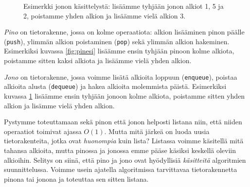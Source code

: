 \begin{figure}
\center
{}
\caption{Esimerkki jonon käsittelystä:
lisäämme tyhjään jonon alkiot 1, 5 ja 2,
poistamme yhden alkion ja lisäämme vielä alkion 3.}
\label{fig:jonesi}
\end{figure}


\emph{Pino} on tietorakenne, jossa on kolme operaatiota:
alkion lisääminen pinon päälle (\texttt{push}),
ylimmän alkion poistaminen (\texttt{pop})
sekä ylimmän alkion hakeminen.
Esimerkiksi kuvassa \ref{fig:pinesi} lisäämme ensin tyhjään pinoon kolme alkiota,
poistamme sitten kaksi alkiota ja lisäämme vielä yhden alkion.


\emph{Jono} on tietorakenne, jossa voimme lisätä alkioita
loppuun (\texttt{enqueue}),
poistaa alkioita alusta (\texttt{dequeue})
ja hakea alkioita molemmista päistä.
Esimerkiksi kuvassa \ref{fig:jonesi} lisäämme ensin tyhjään jonoon
kolme alkiota, poistamme sitten yhden alkion ja lisämme vielä yhden alkion.

Pystymme toteuttamaan sekä pinon että jonon helposti
listana niin, että niiden operaatiot toimivat ajassa $O(1)$.
Mutta mitä järkeä on luoda uusia tietorakenteita,
jotka ovat \emph{huonompia} kuin lista?
Listassa voimme käsitellä mitä tahansa alkioita, mutta
pinossa ja jonossa emme pääse käsiksi keskellä oleviin alkioihin.
Selitys on siinä, että pino ja jono ovat hyödyllisiä 
\emph{käsit\-teitä} algoritmien suunnittelussa.
Voimme usein ajatella algoritmissa tarvittavaa
tietorakennetta pinona tai jonona ja toteuttaa sen sitten listana.

